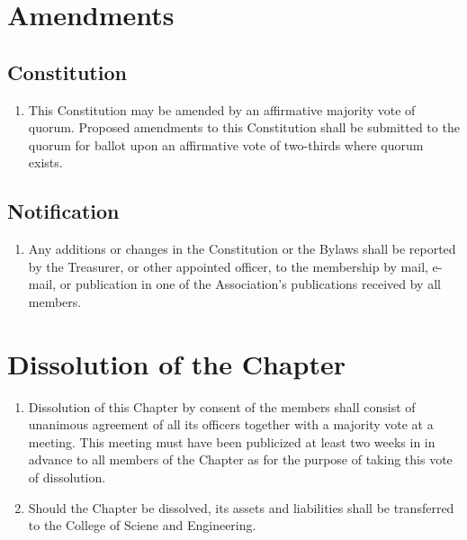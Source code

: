 \section{Amendments}

\subsection{Constitution}
\begin{enumerate}
	\item This Constitution may be amended by an affirmative majority vote of quorum. Proposed amendments to this Constitution shall be submitted to the quorum for ballot upon an affirmative vote of two-thirds where quorum exists.
\end{enumerate}

\subsection{Notification}
\begin{enumerate}
	\item Any additions or changes in the Constitution or the Bylaws shall be reported by the Treasurer, or other appointed officer, to the membership by mail, e-mail, or publication in one of the Association's publications received by all members.
\end{enumerate}

\section{Dissolution of the Chapter}
\begin{enumerate}
	\item Dissolution of this Chapter by consent of the members shall consist of unanimous agreement of all its officers together with a majority vote at a meeting. This meeting must have been publicized at least two weeks in in advance to all members of the Chapter as for the purpose of taking this vote of dissolution.
	\item Should the Chapter be dissolved, its assets and liabilities shall be transferred to the College of Sciene and Engineering.

\end{enumerate}



